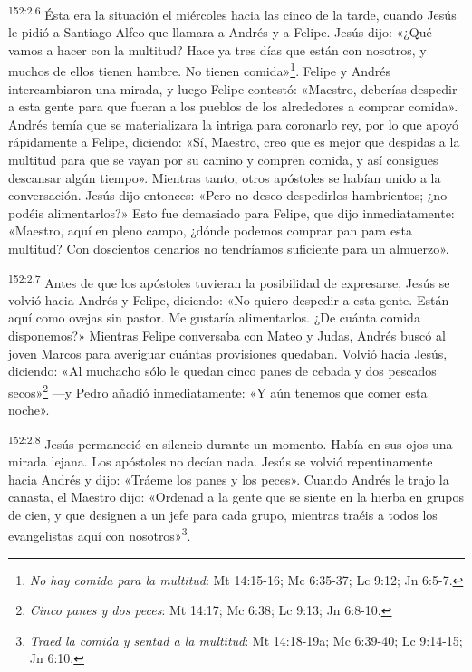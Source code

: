 \par 
\textsuperscript{152:2.6} Ésta era la situación el miércoles hacia las cinco de la tarde, cuando Jesús le pidió a Santiago Alfeo que llamara a Andrés y a Felipe. Jesús dijo: «¿Qué vamos a hacer con la multitud? Hace ya tres días que están con nosotros, y muchos de ellos tienen hambre. No tienen comida»\footnote{\textit{No hay comida para la multitud}: Mt 14:15-16; Mc 6:35-37; Lc 9:12; Jn 6:5-7.}. Felipe y Andrés intercambiaron una mirada, y luego Felipe contestó: «Maestro, deberías despedir a esta gente para que fueran a los pueblos de los alrededores a comprar comida». Andrés temía que se materializara la intriga para coronarlo rey, por lo que apoyó rápidamente a Felipe, diciendo: «Sí, Maestro, creo que es mejor que despidas a la multitud para que se vayan por su camino y compren comida, y así consigues descansar algún tiempo». Mientras tanto, otros apóstoles se habían unido a la conversación. Jesús dijo entonces: «Pero no deseo despedirlos hambrientos; ¿no podéis alimentarlos?» Esto fue demasiado para Felipe, que dijo inmediatamente: «Maestro, aquí en pleno campo, ¿dónde podemos comprar pan para esta multitud? Con doscientos denarios no tendríamos suficiente para un almuerzo».

\par 
\textsuperscript{152:2.7} Antes de que los apóstoles tuvieran la posibilidad de expresarse, Jesús se volvió hacia Andrés y Felipe, diciendo: «No quiero despedir a esta gente. Están aquí como ovejas sin pastor. Me gustaría alimentarlos. ¿De cuánta comida disponemos?» Mientras Felipe conversaba con Mateo y Judas, Andrés buscó al joven Marcos para averiguar cuántas provisiones quedaban. Volvió hacia Jesús, diciendo: «Al muchacho sólo le quedan cinco panes de cebada y dos pescados secos»\footnote{\textit{Cinco panes y dos peces}: Mt 14:17; Mc 6:38; Lc 9:13; Jn 6:8-10.} ---y Pedro añadió inmediatamente: «Y aún tenemos que comer esta noche».

\par 
\textsuperscript{152:2.8} Jesús permaneció en silencio durante un momento. Había en sus ojos una mirada lejana. Los apóstoles no decían nada. Jesús se volvió repentinamente hacia Andrés y dijo: «Tráeme los panes y los peces». Cuando Andrés le trajo la canasta, el Maestro dijo: «Ordenad a la gente que se siente en la hierba en grupos de cien, y que designen a un jefe para cada grupo, mientras traéis a todos los evangelistas aquí con nosotros»\footnote{\textit{Traed la comida y sentad a la multitud}: Mt 14:18-19a; Mc 6:39-40; Lc 9:14-15; Jn 6:10.}.

